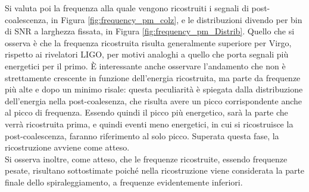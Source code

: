 Si valuta poi la frequenza alla quale vengono ricostruiti i segnali di post-coalescenza, in Figura \ref{fig:frequency_pm_colz}, e le distribuzioni divendo per bin di SNR a larghezza fissata, in Figura \ref{fig:frequency_pm_Distrib}. Quello che si osserva è che la frequenza ricostruita risulta generalmente superiore per Virgo, rispetto ai rivelatori LIGO, per motivi analoghi a quello che porta segnali più energetici per il primo. È interessante anche osservare l'andamento che non è strettamente crescente in funzione dell'energia ricostruita, ma parte da frequenze più alte e dopo un minimo risale: questa peculiarità è spiegata dalla distribuzione dell'energia nella post-coalesenza, che risulta avere un picco corrispondente anche al picco di frequenza. Essendo quindi il picco più energetico, sarà la parte che verrà ricostruita prima, e quindi eventi meno energetici, in cui si ricostruisce la post-coalescenza, faranno riferimento al solo picco. Superata questa fase, la ricostruzione avviene come atteso.\\
Si osserva inoltre, come atteso, che le frequenze ricostruite, essendo frequenze pesate, risultano sottostimate poiché nella ricostruzione viene considerata la parte finale dello spiraleggiamento, a frequenze evidentemente inferiori.
